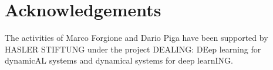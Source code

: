 \documentclass{article}
\begin{document}

\section*{Acknowledgements}                         
The activities of Marco Forgione and Dario Piga have  been supported by HASLER STIFTUNG under the project DEALING: DEep learning for dynamicAL systems and dynamical systems for deep learnING.

\end{document}
